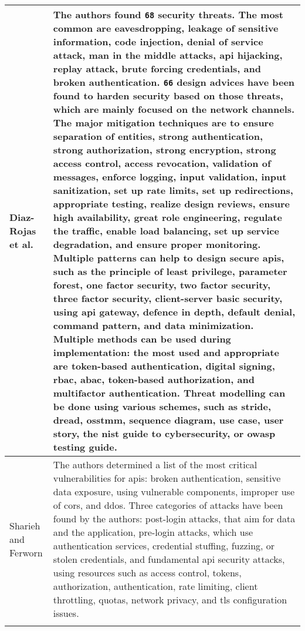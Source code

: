 \begin{small}
\begin{landscape}
\begin{tabularx}{\linewidth}{p{1.5cm}|X}
		Diaz-Rojas et al. \cite{diaz-rojas_web_2021} & The authors found \texttt{68} security threats. The most common are eavesdropping, leakage of sensitive information, code injection, denial of service attack, man in the middle attacks, \gls{api} hijacking, replay attack, brute forcing credentials, and broken authentication. \texttt{66} design advices have been found to harden security based on those threats, which are mainly focused on the network channels. The major mitigation techniques are to ensure separation of entities, strong authentication, strong authorization, strong encryption, strong access control, access revocation, validation of messages, enforce logging, input validation, input sanitization, set up rate limits, set up redirections, appropriate testing, realize design reviews, ensure high availability, great role engineering, regulate the traffic, enable load balancing, set up service degradation, and ensure proper monitoring. Multiple patterns can help to design secure \glspl{api}, such as the principle of least privilege, parameter forest, one factor security, two factor security, three factor security, client-server basic security, using \gls{api} gateway, defence in depth, default denial, command pattern, and data minimization. Multiple methods can be used during implementation: the most used and appropriate are \gls{token}-based authentication, digital signing, \gls{rbac}, \gls{abac}, \gls{token}-based authorization, and multifactor authentication. Threat modelling can be done using various schemes, such as \gls{stride}, \gls{dread}, \gls{osstmm}, sequence diagram, use case, user story, the \gls{nist} guide to cybersecurity, or \gls{owasp} testing guide. \\
		\midrule
		Sharieh and Ferworn \cite{sharieh_securing_2021} & The authors determined a list of the most critical vulnerabilities for \glspl{api}: broken authentication, sensitive data exposure, using vulnerable components, improper use of \gls{cors}, and \gls{ddos}. Three categories of attacks have been found by the authors: post-login attacks, that aim for data and the application, pre-login attacks, which use authentication services, credential stuffing, fuzzing, or stolen credentials, and fundamental \gls{api} security attacks, using resources such as access control, \glspl{token}, authorization, authentication, rate limiting, client throttling, quotas, network privacy, and \gls{tls} configuration issues. \\
		\bottomrule[0.8mm]
		\caption{Application programming interface vulnerabilities, attacks and mitigations comparison}
		\label{table:state_review_results_api}
	\end{tabularx} %


\end{landscape}
\end{small}
